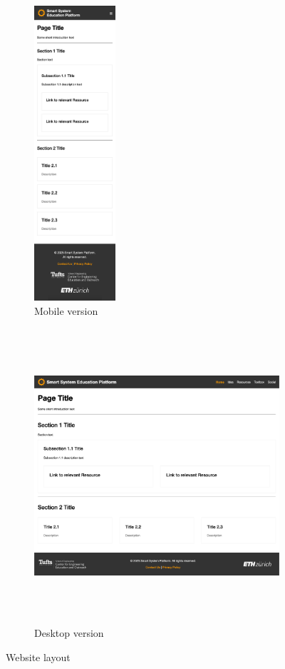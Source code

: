 \begin{figure}[H]
    \centering
    \begin{subfigure}{.18\textwidth}
        \includegraphics[height=310pt]{overleaf/images/website_mobile.png}
        \caption{Mobile version}
    \end{subfigure}
    \begin{subfigure}{.81\textwidth}
        \includegraphics[height=310pt]{overleaf/images/website_desktop.png}
        \caption{Desktop version}
    \end{subfigure}
    \vspace{\ftspace}
    \caption{Website layout}
    \label{fig:website_layout}
\end{figure}

